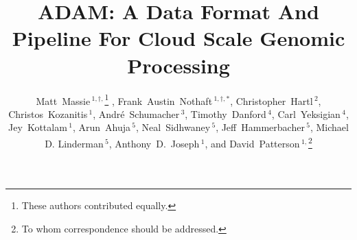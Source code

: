 \documentclass{bioinfo}
\begin{document}

\title[ADAM: Cloud Scale Genomic Processing]{ADAM: A Data Format And Pipeline For Cloud Scale Genomic Processing}
\author[Massie and Nothaft \textit{et~al}]{Matt~Massie\,$^{1,\dagger,}$\footnote{These authors contributed equally.} , Frank~Austin~Nothaft\,$^{1,\dagger, *}$,
Christopher~Hartl\,$^{2}$, Christos~Kozanitis\,$^1$, Andr\'{e}~Schumacher\,$^3$, Timothy~Danford\,$^4$, Carl~Yeksigian\,$^4$, Jey~Kottalam\,$^1$,
Arun~Ahuja\,$^5$, Neal~Sidhwaney\,$^5$, Jeff~Hammerbacher\,$^5$, Michael D. Linderman\,$^5$, Anthony~D.~Joseph\,$^1$, and David~Patterson$\,^{1,}$\footnote{To whom
correspondence should be addressed.}}
\address{$^{1}$Department of Electrical Engineering and Computer Science, University of California, Berkeley, CA\\
$^{2}$The Broad Institute of MIT and Harvard, Cambridge, MA\\
$^{3}$International Computer Science Institute (ICSI), University of California, Berkeley, CA\\
$^{4}$GenomeBridge, Cambridge, MA\\
$^{5}$Icahn Institute for Genomics and Multiscale Biology, Icahn School of Medicine at Mount Sinai, New York, NY}



\maketitle
\end{document}
